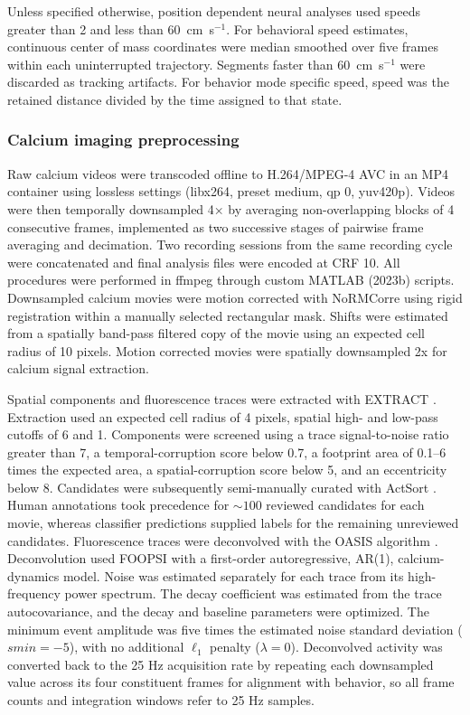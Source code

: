 \documentclass[fleqn,10pt]{wlscirep}
\begin{document}
Unless specified otherwise, position dependent neural analyses used speeds greater than 2 and less than 60~cm~s$^{-1}$. For behavioral speed estimates, continuous center of mass coordinates were median smoothed over five frames within each uninterrupted trajectory. Segments faster than 60~cm~s$^{-1}$ were discarded as tracking artifacts. For behavior mode specific speed, speed was the retained distance divided by the time assigned to that state. 

\subsubsection*{Calcium imaging preprocessing}

Raw calcium videos were transcoded offline to H.264/MPEG-4 AVC in an MP4 container using lossless settings (libx264, preset medium, qp 0, yuv420p). Videos were then temporally downsampled 4× by averaging non-overlapping blocks of 4 consecutive frames, implemented as two successive stages of pairwise frame averaging and decimation. Two recording sessions from the same recording cycle were concatenated and final analysis files were encoded at CRF 10. All procedures were performed in ffmpeg through custom MATLAB (2023b) scripts. Downsampled calcium movies were motion corrected with NoRMCorre \cite{pnevmatikakis_normcorre_2017} using rigid registration within a manually selected rectangular mask. Shifts were estimated from a spatially band-pass filtered copy of the movie using an expected cell radius of 10 pixels. Motion corrected movies were spatially downsampled 2x for calcium signal extraction. 

Spatial components and fluorescence traces were extracted with EXTRACT \cite{dinc_fast_2024}. Extraction used an expected cell radius of 4 pixels, spatial high- and low-pass cutoffs of 6 and 1. Components were screened using a trace signal-to-noise ratio greater than 7, a temporal-corruption score below 0.7, a footprint area of 0.1--6 times the expected area, a spatial-corruption score below 5, and an eccentricity below 8. Candidates were subsequently semi-manually curated with ActSort \cite{jiang_actsort_2024}. Human annotations took precedence for $\sim100$ reviewed candidates for each movie, whereas classifier predictions supplied labels for the remaining unreviewed candidates. Fluorescence traces were deconvolved with the OASIS algorithm \cite{friedrich_fast_2017}. Deconvolution used FOOPSI with a first-order autoregressive, AR(1), calcium-dynamics model. Noise was estimated separately for each trace from its high-frequency power spectrum. The decay coefficient was estimated from the trace autocovariance, and the decay and baseline parameters were optimized. The minimum event amplitude was five times the estimated noise standard deviation ($smin = -5$), with no additional $\ell_{1}$ penalty ($\lambda = 0$). Deconvolved activity was converted back to the 25 Hz acquisition rate by repeating each downsampled value across its four constituent frames for alignment with behavior, so all frame counts and integration windows refer to 25 Hz samples.
\end{document}
